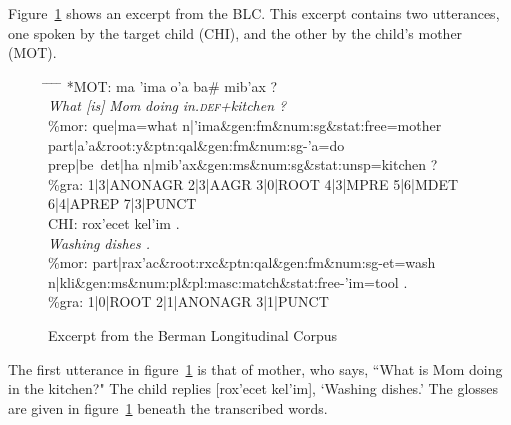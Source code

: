 Figure~\ref{fig:excerpt} shows an excerpt from the \ac{BLC}. This excerpt contains
two utterances, one spoken by the target child (CHI), and the other
by the child's mother (MOT).
\begin{figure}[ht]
\vspace{10pt}
\label{fig:excerpt}
\caption{Excerpt from the Berman Longitudinal Corpus}
\vspace{-12pt}\begin{tabbing}
\small
\hspace{0.6in} \= \hspace{0.6in} \=  \hspace{0.5in} \= \hspace{0.6in} \= \hspace{3.4in} \kill
\textsf{*MOT:} \> \textsf{ma} \> \textsf{\a'{i}ma} \> \textsf{o\a'{a}} \>  \textsf{ba\# mib\a'{a}x ?} \\
\> \textit{What [is]} \> \textit{Mom} \> \textit{doing} \> \textit{in.\textsc{def}+kitchen ?} \\
\textsf{\%mor:} \> \textsf{que|ma=what n|\a'{i}ma\&gen:fm\&num:sg\&stat:free=mother} \\
 \> \textsf{part|a\a'{a}\&root:y\&ptn:qal\&gen:fm\&num:sg-\a'{a}=do} \\
   \> \textsf{prep|be~det|ha n|mib\a'{a}x\&gen:ms\&num:sg\&stat:unsp=kitchen ?}\\
\textsf{\%gra:} \>	\textsf{1|3|ANONAGR 2|3|AAGR 3|0|ROOT 4|3|MPRE 5|6|MDET 6|4|APREP 7|3|PUNCT}\\
\textsf{CHI:} \> \textsf{rox\a'{e}cet} \> \textsf{kel\a'{i}m .}\\
		\> \textit{Washing} \> \textit{dishes .}  \\
\textsf{\%mor:} \> \textsf{part|rax\a'{a}c\&root:rxc\&ptn:qal\&gen:fm\&num:sg-et=wash} \\ 
    \>  \textsf{n|kli}\&\textsf{gen:ms\&num:pl\&pl:masc:match\&stat:free-\a'{i}m=tool .} \\ 
\textsf{\%gra:} \> \textsf{1|0|ROOT 2|1|ANONAGR 3|1|PUNCT}
\end{tabbing}
\end{figure}
The first utterance in figure~\ref{fig:excerpt} is that of mother,
who says, ``What is Mom doing in the kitchen?" The child
replies \textsf{[rox\a'{e}cet kel\a'{i}m]}, `Washing dishes.' The glosses are given in figure~\ref{fig:excerpt} beneath
the transcribed words.

